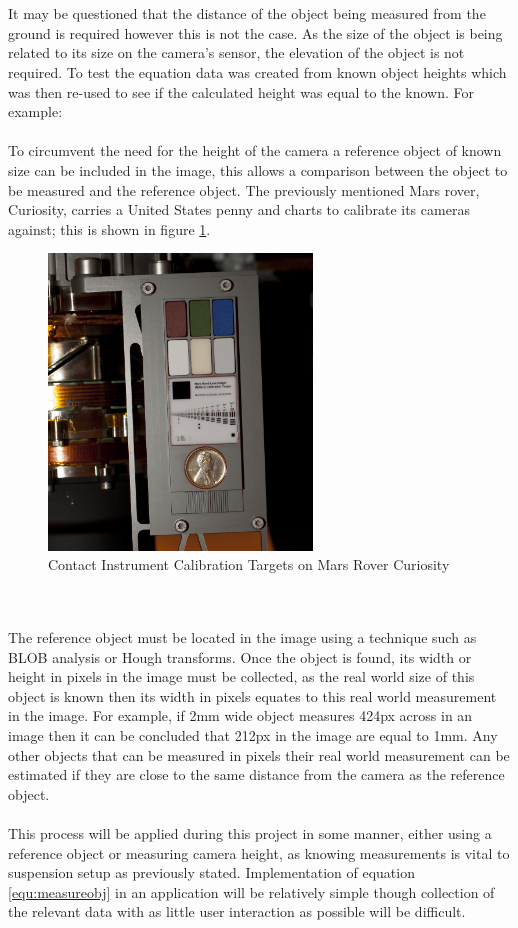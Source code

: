 	\\\\
	It may be questioned that the distance of the object being measured from the ground is required however this is not the case. As the size of the object is being related to its size on the camera's sensor, the elevation of the object is not required. To test the equation data was created from known object heights which was then re-used to see if the calculated height was equal to the known. For example:
	\\\\
	To circumvent the need for the height of the camera a reference object of known size can be included in the image, this allows a comparison between the object to be measured and the reference object. The previously mentioned Mars rover, Curiosity, carries a United States penny and charts to calibrate its cameras against; this is shown in figure \ref{fig:curiosity_calibration_chart}.
	\begin{figure}[h!]
		\centering
		\includegraphics[width=7cm]{../images/curiosity_calibration_chart.jpg}
		\caption{Contact Instrument Calibration Targets on Mars Rover Curiosity \citep{curiosity_image_calibration}}
		\label{fig:curiosity_calibration_chart}
	\end{figure}\\\\
	The reference object must be located in the image using a technique such as BLOB analysis or Hough transforms. Once the object is found, its width or height in pixels in the image must be collected, as the real world size of this object is known then its width in pixels equates to this real world measurement in the image. For example, if 2mm wide object measures 424px across in an image then it can be concluded that 212px in the image are equal to 1mm. Any other objects that can be measured in pixels their real world measurement can be estimated if they are close to the same distance from the camera as the reference object.
	\\\\
	This process will be applied during this project in some manner, either using a reference object or measuring camera height, as knowing measurements is vital to suspension setup as previously stated. Implementation of equation \ref{equ:measureobj} in an application will be relatively simple though collection of the relevant data with as little user interaction as possible will be difficult.